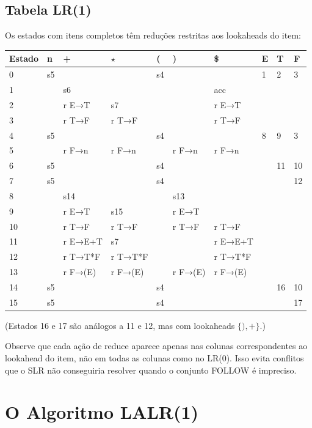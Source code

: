 \subsection{Tabela LR(1)}\label{tabela-lr1}

Os estados com itens completos têm reduções restritas aos lookaheads do item:

\begin{table}[H]
\begin{tabular}{@{}llllllllll@{}}
\toprule
Estado & n & + & $\star$ & ( & ) & \$ & E & T & F \\
\midrule
0 & s5 & & & s4 & & & 1 & 2 & 3 \\
1 & & s6 & & & & acc & & & \\
2 & & r E→T & s7 & & & r E→T & & & \\
3 & & r T→F & r T→F & & & r T→F & & & \\
4 & s5 & & & s4 & & & 8 & 9 & 3 \\
5 & & r F→n & r F→n & & r F→n & r F→n & & & \\
6 & s5 & & & s4 & & & & 11 & 10 \\
7 & s5 & & & s4 & & & & & 12 \\
8 & & s14 & & & s13 & & & & \\
9 & & r E→T & s15 & & r E→T & & & & \\
10 & & r T→F & r T→F & & r T→F & r T→F & & & \\
11 & & r E→E+T & s7 & & & r E→E+T & & & \\
12 & & r T→T*F & r T→T*F & & & r T→T*F & & & \\
13 & & r F→(E) & r F→(E) & & r F→(E) & r F→(E) & & & \\
14 & s5 & & & s4 & & & & 16 & 10 \\
15 & s5 & & & s4 & & & & & 17 \\
\bottomrule
\end{tabular}
\centering
\end{table}

(Estados 16 e 17 são análogos a 11 e 12, mas com lookaheads \(\{),+\}\).)

Observe que cada ação de reduce aparece apenas nas colunas
correspondentes ao lookahead do item, não em todas as colunas como no
LR(0). Isso evita conflitos que o SLR não conseguiria resolver quando
o conjunto FOLLOW é impreciso.

\section{O Algoritmo LALR(1)}

